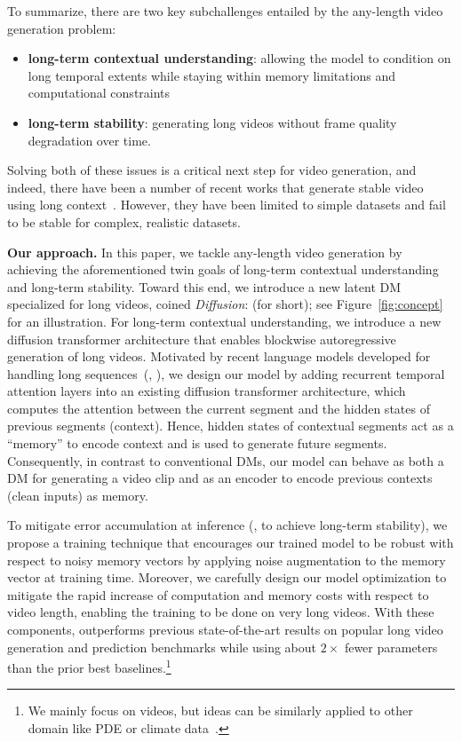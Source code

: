 To summarize, there are two key subchallenges entailed by the any-length video generation problem:
\begin{itemize}[leftmargin=*,itemsep=0mm]
    \item \textbf{long-term contextual understanding}: allowing the model to condition on long temporal extents while staying within memory limitations and computational constraints
    \item \textbf{long-term stability}: generating long videos without frame quality degradation over time.
\end{itemize}
Solving both of these issues is a critical next step for video generation, and indeed, there have been a number of recent works that generate stable video using long context~\citep{harvey2022flexible,yan2023temporally}. However, they have been limited to simple datasets and fail to be stable for complex, realistic datasets. 


\vspace{0.02in}
\noindent\textbf{Our approach.}
In this paper, we tackle any-length video generation by achieving the aforementioned twin goals of long-term contextual understanding and long-term stability. Toward this end, we introduce a new latent DM specialized for long videos, coined \emph{\sname Diffusion}: \lname (\sname for short); see Figure~\ref{fig:concept} for an illustration. For long-term contextual understanding, we introduce a new diffusion transformer architecture that enables blockwise autoregressive generation of long videos. Motivated by recent language models developed for handling long sequences~(\eg, \citep{dai2019transformer}), we design our model by adding recurrent temporal attention layers into an existing diffusion transformer architecture, which computes the attention between the current segment and the hidden states of previous segments (context). Hence, hidden states of contextual segments act as a ``memory'' to encode context and is used to generate future segments. Consequently, in contrast to conventional DMs, our model can behave as both a DM for generating a video clip and as an encoder to encode previous contexts (clean inputs) as memory.

To mitigate error accumulation at inference (\ie, to achieve long-term stability), we propose a training technique that
encourages our trained model to be robust with 
respect to noisy memory vectors by applying noise augmentation to the memory vector at training time. Moreover, we carefully design our model optimization to mitigate the rapid increase of
computation and memory costs with respect to video length, enabling the training to be done on very long videos. 
With these components, \sname outperforms previous state-of-the-art results on popular long video generation and prediction benchmarks \citep{yu2023video,yan2023temporally} while using about $2\times$ fewer parameters than the prior best baselines.\footnote{We mainly focus on videos, but ideas can be similarly applied to other domain like PDE or climate data~\citep{ruhe2024rolling}.}


